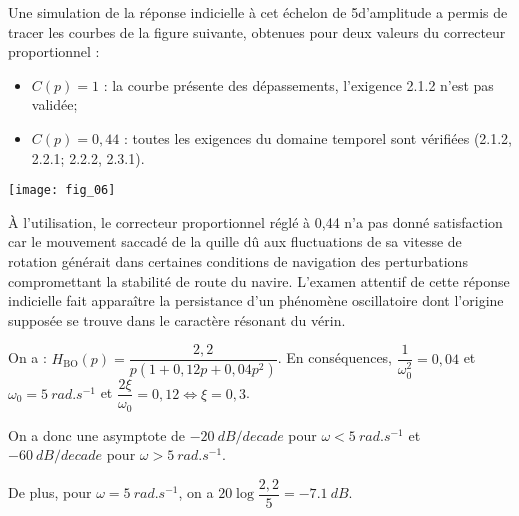 %
%
%

\ifprof
\else
Une simulation de la réponse indicielle à cet échelon de 5\degres d’amplitude a permis de tracer les courbes de la
figure suivante, obtenues pour deux valeurs du correcteur proportionnel :
\begin{itemize}
\item $C(p) = 1$ : la courbe présente des dépassements, l'exigence 2.1.2 n'est pas validée;%
\item $C(p) = 0,44$ : toutes les exigences du domaine temporel sont vérifiées (2.1.2, 2.2.1; 2.2.2, 2.3.1).%
\end{itemize}

\begin{marginfigure}
\texttt{[image: fig\_06]}
\end{marginfigure}

À l’utilisation, le correcteur proportionnel réglé à 0,44 n’a pas donné satisfaction car le mouvement saccadé
de la quille dû aux fluctuations de sa vitesse de rotation générait dans certaines conditions de navigation des
perturbations compromettant la stabilité de route du navire. L’examen attentif de cette réponse indicielle
fait apparaître la persistance d’un phénomène oscillatoire dont l’origine supposée se trouve dans le
caractère résonant du vérin.

\fi

\ifprof
\begin{corrige}
On a : $H_{\text{BO}}(p)=\dfrac{2,2}{p\left(1+0,12p + 0,04 p ^2  \right)}$. En conséquences, $\dfrac{1}{\omega_0^2}={0,04}$ et $\omega_0 = \SI{5}{rad.s^{-1}}$ et $\dfrac{2\xi}{\omega_0}=0,12 \Leftrightarrow \xi=0,3$.


On a donc une asymptote de $-\SI{20}{dB/decade}$ pour $\omega<\SI{5}{rad.s^{-1}}$ et $-\SI{60}{dB/decade}$ pour $\omega>\SI{5}{rad.s^{-1}}$.

De plus, pour $\omega=\SI{5}{rad.s^{-1}}$, on a $20\log\dfrac{2,2}{5}=\SI{-7,1}{dB}$. 

\end{corrige}
\else
\fi

